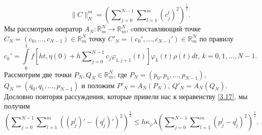 $$\|C\|_N^m=\left(\sum\nolimits_{j=0}^{N-1} \sum\nolimits_{l=1}^{m}(c_j^l)^2\right)^\frac12.$$
 Мы рассмотрим оператор $A_N:\mathbb{R}^N_m\to \mathbb{R}^N_m$, cопоставляющий точке\\
$C_N=(c_0,\ldots,c_{N-1})\in \mathbb{R}^N_m $ точку  $C'_N=(c_0',\ldots,c_{N-1}')\in \mathbb{R}^N_m $ по правилу
\begin{equation}\label{3.18}
c_k'=\int\limits_{0}^1f\left[ht,\eta(0)+ h\sum\nolimits_{j=0}^{N-1} c_j\varphi_{1,j+1}(t)\right]\varphi_k(t)\rho(t) dt,\,k=0,1,\ldots, N-1.
\end{equation}
 Рассмотрим две точки $P_N,Q_N\in \mathbb{R}^N_m$, где $P_N=(p_0,p_1,\ldots,p_{N-1})$,\\   $Q_N=(q_0,q_1,\ldots,p_{N-1})$ и положим $P'_N=A_N(P_N)$, $Q'_N=A_N(Q_N)$. Дословно повторяя рассуждения, которые привели нас к неравенству \eqref{3.17}, мы получим
\begin{equation}\label{3.19}
\left(\sum\nolimits_{j=0}^{N-1}\sum\nolimits_{l=1}^m((p^l_j)'-(q^l_j)')^2\right)^\frac12\le h\kappa_\varphi\lambda \left(\sum\nolimits_{j=0}^{N-1}\sum\nolimits_{l=1}^m( p^l_j-q^l_j)^2\right)^\frac12.
\end{equation}

